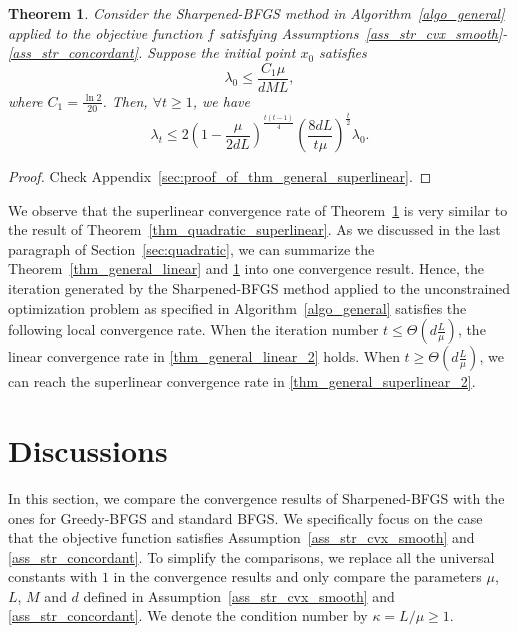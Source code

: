 \documentclass[11pt]{article}
\numberwithin{assumption}{section}
\numberwithin{remark}{section}
\newtheorem{theorem}{Theorem}
\numberwithin{theorem}{section}
\begin{document}
\begin{theorem}\label{thm_general_superlinear}
Consider the Sharpened-BFGS method in Algorithm~\ref{algo_general} applied to the objective function $f$ satisfying Assumptions~\ref{ass_str_cvx_smooth}-\ref{ass_str_concordant}. Suppose the initial point $x_0$ satisfies
\begin{equation}\label{thm_general_superlinear_1}
\lambda_0 \leq \frac{C_1\mu}{dML}, 
\end{equation}
where $ C_1 = \frac{\ln{2}}{20}$. 
Then, $\forall t \geq 1$, we have
\begin{equation}\label{thm_general_superlinear_2}
    \lambda_t \leq 2\left(1 - \frac{\mu}{2dL}\right)^{\frac{t(t - 1)}{4}} \left(\frac{8dL}{t\mu}\right)^{\frac{t}{2}}\lambda_0.
\end{equation}

\end{theorem}

\begin{proof}
Check Appendix~\ref{sec:proof_of_thm_general_superlinear}.
\end{proof}

We observe that the superlinear convergence rate of Theorem~\ref{thm_general_superlinear} is very similar to the result of Theorem~\ref{thm_quadratic_superlinear}. As we discussed in the last paragraph of Section~\ref{sec:quadratic}, we can summarize the Theorem~\ref{thm_general_linear} and \ref{thm_general_superlinear} into one convergence result. Hence, the iteration generated by the Sharpened-BFGS method applied to the unconstrained optimization problem as specified in Algorithm~\ref{algo_general} satisfies the following local convergence rate. When the iteration number $t \leq \Theta(d\frac{L}{\mu})$, the linear convergence rate in \eqref{thm_general_linear_2} holds. When $t \geq \Theta(d\frac{L}{\mu})$, we can reach the superlinear convergence rate in \eqref{thm_general_superlinear_2}.

\section{Discussions}\label{sec:discussion}

In this section, we compare the convergence results of Sharpened-BFGS with the  ones for Greedy-BFGS and standard BFGS. We specifically focus on the case that the objective function satisfies Assumption~\ref{ass_str_cvx_smooth} and \ref{ass_str_concordant}. 
To simplify the comparisons, we replace all the universal constants with $1$ in the convergence results and only compare the parameters $\mu$, $L$, $M$ and $d$ defined in Assumption~\ref{ass_str_cvx_smooth} and \ref{ass_str_concordant}. We denote the condition number by $\kappa = {L}/{\mu} \geq 1$. 
\end{document}

